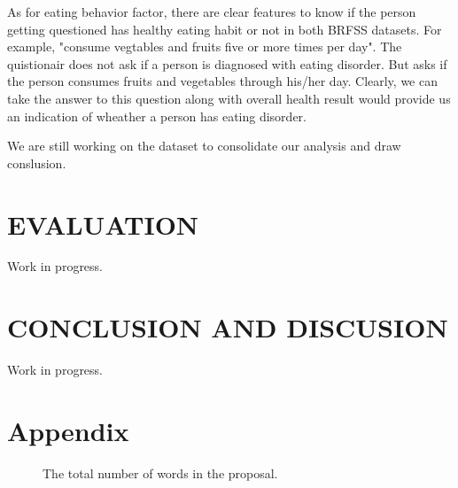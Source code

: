 \documentclass[letterpaper, 10 pt, conference]{ieeeconf}  %
\begin{document}
As for eating behavior factor, there are clear features to know if the person getting questioned has 
healthy eating habit or not in both BRFSS datasets. For example, "consume vegtables and fruits five or more times per day".
The quistionair does not ask if a person is diagnosed with eating disorder. But asks if the person consumes 
fruits and vegetables through his/her day. Clearly, we can take the answer to this question along with overall health
result would provide us an indication of wheather a person has eating disorder.

We are still working on the dataset to consolidate our analysis and draw conslusion. 

\section{EVALUATION}
Work in progress.

\section{CONCLUSION AND DISCUSION}
Work in progress.

%
\captionsetup[figure]{labelformat=empty}
\clearpage 
\begin{figure}[hbt!]
        \centering
        
        \addvspace{250pt}
        
        \hspace{-10cm}
        
        \caption{}
        \label{fig:schedule}
\end{figure}

\clearpage 




\section{Appendix}
\begin{figure}[!htb]
        \caption{\label{fig:my-label} The total number of words in the proposal.}
\end{figure}
\end{document}
